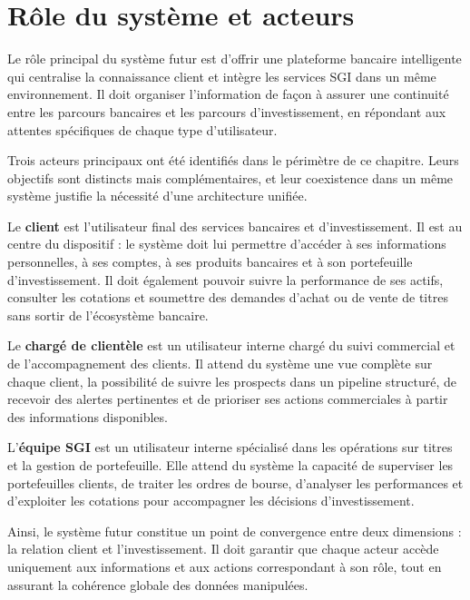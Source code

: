 \documentclass[a4paper,12pt]{report}
\begin{document}
\section{Rôle du système et acteurs}

Le rôle principal du système futur est d'offrir une plateforme bancaire intelligente qui
centralise la connaissance client et intègre les services SGI dans un même environnement.
Il doit organiser l'information de façon à assurer une continuité entre les parcours
bancaires et les parcours d'investissement, en répondant aux attentes spécifiques de chaque
type d'utilisateur.

Trois acteurs principaux ont été identifiés dans le périmètre de ce chapitre. Leurs
objectifs sont distincts mais complémentaires, et leur coexistence dans un même système
justifie la nécessité d'une architecture unifiée.

Le \textbf{client} est l'utilisateur final des services bancaires et d'investissement. Il
est au centre du dispositif : le système doit lui permettre d'accéder à ses informations
personnelles, à ses comptes, à ses produits bancaires et à son portefeuille
d'investissement. Il doit également pouvoir suivre la performance de ses actifs, consulter
les cotations et soumettre des demandes d'achat ou de vente de titres sans sortir de
l'écosystème bancaire.

Le \textbf{chargé de clientèle} est un utilisateur interne chargé du suivi commercial et
de l'accompagnement des clients. Il attend du système une vue complète sur chaque client,
la possibilité de suivre les prospects dans un pipeline structuré, de recevoir des alertes
pertinentes et de prioriser ses actions commerciales à partir des informations
disponibles.

L'\textbf{équipe SGI} est un utilisateur interne spécialisé dans les opérations sur titres
et la gestion de portefeuille. Elle attend du système la capacité de superviser les
portefeuilles clients, de traiter les ordres de bourse, d'analyser les performances et
d'exploiter les cotations pour accompagner les décisions d'investissement.

Ainsi, le système futur constitue un point de convergence entre deux dimensions : la
relation client et l'investissement. Il doit garantir que chaque acteur accède uniquement
aux informations et aux actions correspondant à son rôle, tout en assurant la cohérence
globale des données manipulées.

\end{document}
